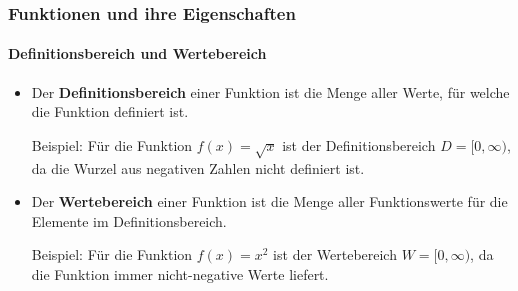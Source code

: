 \documentclass{beamer}
\begin{document}
\begin{frame}
    \frametitle{Funktionen und ihre Eigenschaften}
    \framesubtitle{Definitionsbereich und Wertebereich}
  
    \begin{itemize}
      \item Der \textbf{Definitionsbereich} einer Funktion ist die Menge aller Werte, für welche die Funktion definiert ist.\\
      \begin{scriptsize}
        Beispiel: Für die Funktion $f(x) = \sqrt{x}$ ist der Definitionsbereich $D = [0, \infty)$, da die Wurzel aus negativen Zahlen nicht definiert ist.
       \end{scriptsize}
      \item Der \textbf{Wertebereich} einer Funktion ist die Menge aller Funktionswerte für die Elemente im Definitionsbereich.
      \begin{scriptsize}
        Beispiel: Für die Funktion $f(x) = x^2$ ist der Wertebereich $W = [0, \infty)$, da die Funktion immer nicht-negative Werte liefert.
    \end{scriptsize}
   \end{itemize}
   \vspace*{-.5cm}
    \begin{flushright}
      \end{flushright}
  \end{frame}
\end{document}
